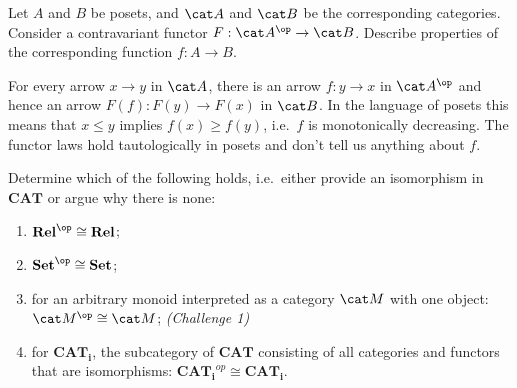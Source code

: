 \begin{exercise}
  Let $A$ and $B$ be posets, and $\A$ and $\B$ be the corresponding categories. Consider a contravariant functor $F:\A^{\op}\rightarrow \B$. Describe properties of the corresponding function $f:A\rightarrow B$.
\end{exercise}

\begin{answer}
  For every arrow $x \to y$ in $\A$, there is an arrow $f : y \to x$ in $\A^\op$ and hence an arrow $F(f) : F(y) \to F(x)$ in $\B$.
  In the language of posets this means that $x \leq y$ implies $f(x) \geq f(y)$, i.e.\ $f$ is monotonically decreasing.
  The functor laws hold tautologically in posets and don't tell us anything about $f$.
\end{answer}

\begin{exercise} 
  Determine which of the following holds, i.e.\ either provide an isomorphism in $\mathbf{CAT}$ or argue why there is none:

  \begin{enumerate}
  \item $\mathbf {Rel}^{\op}\cong \mathbf {Rel}$;
  \item $\mathbf {Set}^{\op}\cong \mathbf {Set}$;
  \item for an arbitrary monoid interpreted as a category $\M$ with one object:  $\M^{\op}\cong \M$; \textit{(Challenge 1)}
  \item for $\mathbf{CAT_i}$, the subcategory of $\mathbf{CAT}$ consisting of all categories and functors that are isomorphisms: $\mathbf{CAT_i}^{op}\cong\mathbf{CAT_i}$.
  \end{enumerate}

\end{exercise}

